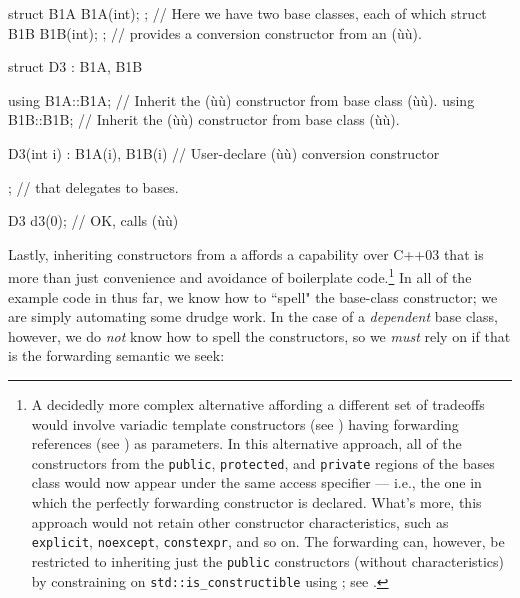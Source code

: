 \begin{emcppslisting}[language=C++]
struct B1A { B1A(int); };  // Here we have two base classes, each of which
struct B1B { B1B(int); };  // provides a conversion constructor from an (ù{}ù).

struct D3 : B1A, B1B
{
    using B1A::B1A;  // Inherit the (ù{}ù) constructor from base class (ù{}ù).
    using B1B::B1B;  // Inherit the (ù{}ù) constructor from base class (ù{}ù).

    D3(int i) : B1A(i), B1B(i) { }  // User-declare (ù{}ù) conversion constructor
};                                  // that delegates to bases.

D3 d3(0);  // OK, calls (ù{}ù)
\end{emcppslisting}
    
\noindent Lastly, inheriting constructors from a  affords a capability over C++03 that is more than just convenience
and avoidance of boilerplate code.{\cprotect\footnote{A decidedly more
complex alternative affording a different set of tradeoffs would
  involve variadic template constructors (see ) 
  having
 forwarding references (see ) 
 as parameters. In this
  alternative approach, all of the constructors from the
  \mbox{\lstinline!public!}, \mbox{\lstinline!protected!}, and \mbox{\lstinline!private!} regions of the
  bases class would now appear under the same access specifier --- i.e.,
  the one in which the perfectly forwarding constructor is declared.
  What's more, this approach would not retain other constructor
  characteristics, such as \lstinline!explicit!, \lstinline!noexcept!,
  \lstinline!constexpr!, and so on. The forwarding can, however, be restricted to
  inheriting just the \lstinline!public! constructors (without
  characteristics) by constraining on \lstinline!std::is_constructible!
  using ; see .}} 
  In all of the example code in  
  thus far, we know how to ``spell" the
base-class constructor; we are simply automating some drudge work. In
the case of a \emph{dependent} base class, however, we do \emph{not}
know how to spell the constructors, so we \emph{must} rely on
 if that is the forwarding semantic we
seek:

